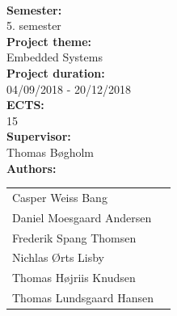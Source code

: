 \newpage
\makeatother
\begin{minipage}[T]{0.45\textwidth}
 \begin{flushleft}
  \textbf{\normalsize{}}\\ \maketitle
  \textbf{\normalsize{Semester:}}\\5. semester\\
  \textbf{\normalsize{Project theme:}}\\Embedded Systems\\
  \textbf{\normalsize{Project duration:}}\\04/09/2018 - 20/12/2018\\
  \textbf{\normalsize{ECTS:}}\\15\\
  \textbf{\normalsize{Supervisor:}}\\Thomas Bøgholm\\

  \large{\textsf{\textbf{\normalsize{Authors:}}}}\\
  \begin{tabular}{ll}
   \normalsize{Casper Weiss Bang}\\
   \normalsize{Daniel Moesgaard Andersen}\\
   \normalsize{Frederik Spang Thomsen}\\
   \normalsize{Nichlas Ørts Lisby}\\
   \normalsize{Thomas Højriis Knudsen}\\
   \normalsize{Thomas Lundsgaard Hansen}\\
  \end{tabular}
 \end{flushleft}
\end{minipage}
 ~
